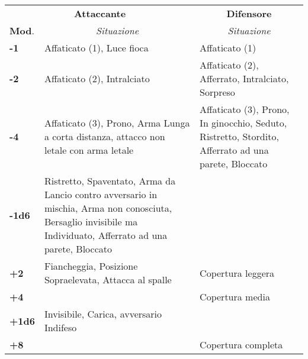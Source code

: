 \documentclass[landscape,10pt,a4paper]{article}
\begin{document}
\begin{multicols}{2}
\begin{dmbox}[title=Condizioni]
		\noindent\begin{tabularx}{0.98\textwidth}{l|X|X}
			\multicolumn{2}{c}{\textbf{Attaccante}}&\multicolumn{1}{c}{\textbf{Difensore}}\\
			\textbf{Mod}.&\multicolumn{1}{c}{\emph{Situazione}}&\multicolumn{1}{c}{\emph{Situazione}}\\
			\textbf{-1}& Affaticato (1), Luce fioca&Affaticato (1)\\
			\hline
			\textbf{-2}& Affaticato (2), Intralciato & Affaticato (2), Afferrato, Intralciato, Sorpreso\\
			\hline
			\textbf{-4}& Affaticato (3), Prono, Arma Lunga a corta distanza, attacco non letale con arma letale& Affaticato (3), Prono, In ginocchio, Seduto, Ristretto, Stordito, Afferrato ad una parete, Bloccato\\
			\hline
			\textbf{-1d6}& Ristretto, Spaventato, Arma da Lancio contro avversario in mischia, Arma non conosciuta, Bersaglio invisibile ma Individuato, Afferrato ad una parete, Bloccato&\\
			\hline
			\textbf{+2}& Fiancheggia, Posizione Sopraelevata, Attacca al spalle& Copertura leggera\\
			\hline
			\textbf{+4}&& Copertura media\\
			\hline
			\textbf{+1d6}& Invisibile, Carica, avversario Indifeso& \\
			\hline
			\textbf{+8}&& Copertura completa
		\end{tabularx}
		
	\end{dmbox}
	
	
	
	

\end{multicols}
\end{document}
